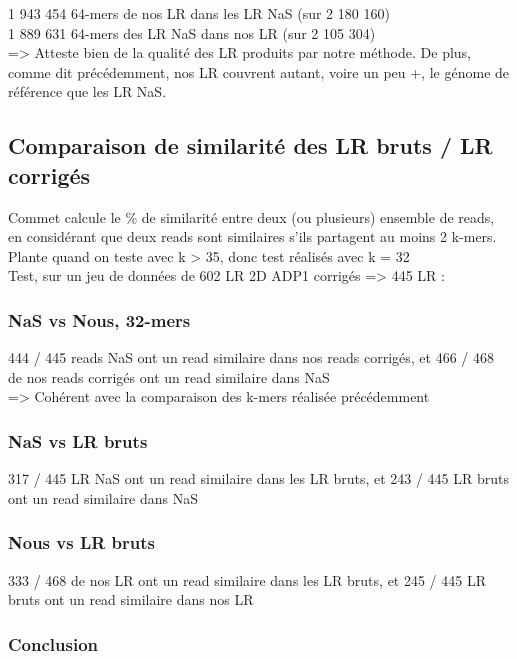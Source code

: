 \documentclass[12pt]{article}
\begin{document}
1 943 454 64-mers de nos LR dans les LR NaS (sur 2 180 160) \\

1 889 631 64-mers des LR NaS dans nos LR (sur 2 105 304) \\

=> Atteste bien de la qualité des LR produits par notre méthode. De plus, comme dit précédemment, nos LR couvrent autant, voire un peu +, le génome
de référence que les LR NaS.

\subsection{Comparaison de similarité des LR bruts / LR corrigés}

Commet calcule le \% de similarité entre deux (ou plusieurs) ensemble de reads, en considérant que deux reads sont similaires
s'ils partagent au moins 2 k-mers. Plante quand on teste avec k > 35, donc test réalisés avec k = 32 \\

Test, sur un jeu de données de 602 LR 2D ADP1 corrigés => 445 LR :

\subsubsection{NaS vs Nous, 32-mers}

444 / 445 reads NaS ont un read similaire dans nos reads corrigés, et 466 / 468 de nos reads corrigés ont un read similaire dans NaS \\

=> Cohérent avec la comparaison des k-mers réalisée précédemment

\subsubsection{NaS vs LR bruts}

317 / 445 LR NaS ont un read similaire dans les LR bruts, et 243 / 445 LR bruts ont un read similaire dans NaS

\subsubsection{Nous vs LR bruts}

333 / 468 de nos LR ont un read similaire dans les LR bruts, et 245 / 445 LR bruts ont un read similaire dans nos LR

\subsubsection{Conclusion}
\end{document}
